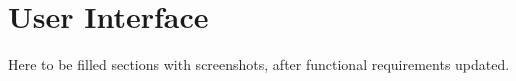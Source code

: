 \chapter{User Interface}\label{ch:user-interface}

Here to be filled sections with screenshots, after functional requirements updated.
